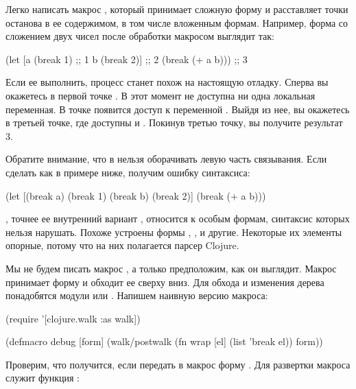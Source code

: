 Легко написать макрос , который принимает сложную форму и расставляет точки останова в ее содержимом, в том числе вложенным формам. Например, форма  со сложением двух чисел после обработки макросом выглядит так:

\begin{english}
  \begin{clojure}
(let [a (break 1)   ;; 1
      b (break 2)]  ;; 2
  (break (+ a b)))  ;; 3
  \end{clojure}
\end{english}

Если ее выполнить, процесс станет похож на настоящую отладку. Сперва вы окажетесь в первой точке . В этот момент не доступна ни одна локальная переменная. В точке  появится доступ к переменной . Выйдя из нее, вы окажетесь в третьей точке, где доступны  и . Покинув третью точку, вы получите результат 3.

Обратите внимание, что в  нельзя оборачивать левую часть связывания. Если сделать как в примере ниже, получим ошибку синтаксиса:

\begin{english}
  \begin{clojure}
(let [(break a) (break 1)
      (break b) (break 2)]
  (break (+ a b)))
  \end{clojure}
\end{english}

, точнее ее внутренний вариант , относится к особым формам, синтаксис которых нельзя нарушать. Похоже устроены формы , ,  и другие. Некоторые их элементы опорные, потому что на них полагается парсер Clojure.

Мы не будем писать макрос , а только предположим, как он выглядит. Макрос принимает форму и обходит ее сверху вниз. Для обхода и изменения дерева понадобятся модули  или . Напишем наивную версию макроса:

\begin{english}
  \begin{clojure}
(require '[clojure.walk :as walk])

(defmacro debug [form]
  (walk/postwalk
   (fn wrap [el]
     (list 'break el))
   form))
  \end{clojure}
\end{english}

Проверим, что получится, если передать в макрос форму . Для развертки макроса служит функция :

